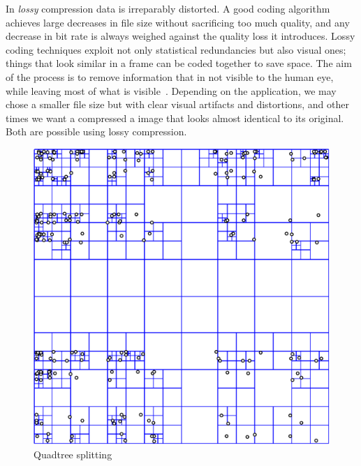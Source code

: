 In \textit{lossy} compression data is irreparably distorted. A good coding algorithm achieves large decreases in file size without sacrificing too much quality, and any decrease in bit rate is always weighed against the quality loss it introduces. Lossy coding techniques exploit not only statistical redundancies but also visual ones; things that look similar in a frame can be coded together to save space. The aim of the process is to remove information that in not visible to the human eye, while leaving most of what is visible~\cite{Flierl}. Depending on the application, we may chose a smaller file size but with clear visual artifacts and distortions, and other times we want a compressed a image that looks almost identical to its original. Both are possible using lossy compression.


\begin{figure}
    \centering
    \includegraphics[scale=0.4]{pictures/wikipedia/public-domain/Point_quadtree.pdf}
    \caption{Quadtree splitting}
    \label{fig:quadtree}
\end{figure}


